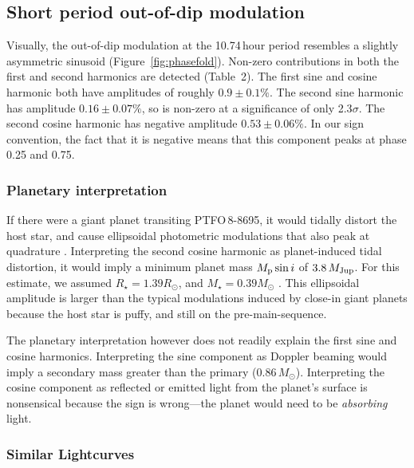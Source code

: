 \documentclass[12pt,twocolumn,tighten]{aastex62}
\newcommand{\ptfo}{PTFO$\,$8-8695}
\begin{document}
\subsection{Short period out-of-dip modulation}

Visually, the out-of-dip modulation at the 10.74$\,$hour period
resembles a slightly asymmetric sinusoid (Figure~\ref{fig:phasefold}).
Non-zero contributions in both the first and second harmonics are
detected (Table~2).  The first sine and cosine harmonic both have
amplitudes of roughly $0.9\pm0.1\%$.  The second sine harmonic has
amplitude $0.16 \pm 0.07\%$, so is non-zero at a significance of only
2.3$\sigma$.  The second cosine harmonic has negative amplitude $0.53
\pm 0.06\%$.  In our sign convention, the fact that it is negative
means that this component peaks at phase 0.25 and 0.75.

\subsubsection{Planetary interpretation}
If there were a giant planet transiting \ptfo, it would tidally
distort the host star, and cause ellipsoidal photometric modulations
that also peak at quadrature \citep[see][]{shporer_astrophysics_2017}.
Interpreting the second cosine harmonic as planet-induced tidal distortion,
it would imply a minimum planet mass $M_{\rm p} \sin i$ of
$3.8\,M_{\rm Jup}$.  For this estimate, we assumed $R_\star = 1.39
R_\odot$, and $M_\star = 0.39 M_\odot$ \citep{van_eyken_ptf_2012}.
This ellipsoidal amplitude is larger than the typical
modulations induced by close-in giant planets because the host star is
puffy, and still on the pre-main-sequence.

The planetary interpretation however does not readily explain the
first sine and cosine harmonics.  Interpreting the sine component as
Doppler beaming would imply a secondary mass greater than the primary
($0.86\,M_\odot$).  Interpreting the cosine component as reflected or
emitted light from the planet's surface is nonsensical because the sign is wrong---the
planet would need to be {\it absorbing} light.

\subsubsection{Similar Lightcurves}
\label{subsec:dipstars}
\end{document}
